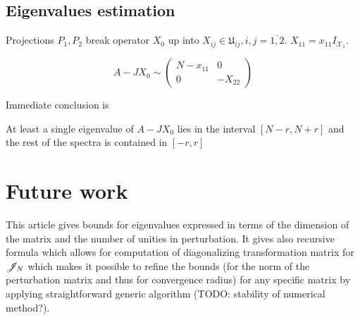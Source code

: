 \documentclass{article}
\begin{document}
\subsection{Eigenvalues estimation}
Projections $P_1, P_2$ break operator $X_0$ up into $X_{ij}\in\mathfrak U_{ij}, i,j=\overline{1,2}$.
$X_{11} = x_{11} I_{\mathcal X_1}$.

\[
    A-JX_0 \sim
    \left(
\begin{array}{c|c}
    N-x_{11} & 0 \\
    \hline
    0        & -X_{22}
\end{array}
\right)
\]

Immediate conclusion is
\begin{lemma}
    At least a single eigenvalue of $A-JX_0$ lies in the interval $\left[N-r,N+r\right]$
    and the rest of the spectra is contained in $\left[-r,r\right]$
\end{lemma}

%

\section{Future work}
This article gives bounds for eigenvalues expressed in terms of the dimension of the matrix and the number of unities in perturbation.
It gives also recursive formula which allows for computation of diagonalizing transformation matrix for $\mathscr{J}_{N}$
which makes it possible to refine the bounds (for the norm of the perturbation matrix and thus for convergence radius)
for any specific matrix by applying straightforward generic algorithm (TODO: stability of numerical method?).
\end{document}
